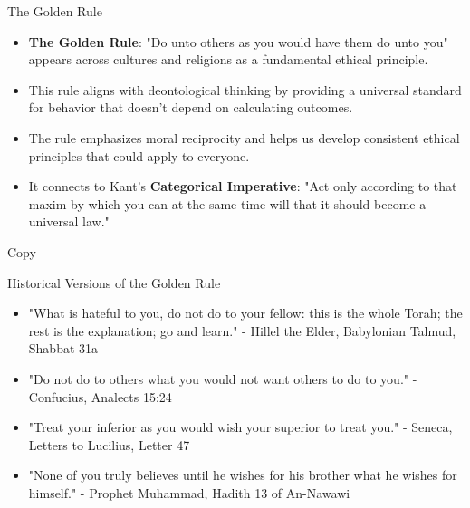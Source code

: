 \documentclass{beamer}
\begin{document}
\begin{frame}{The Golden Rule}
\begin{itemize}
    \item \textbf{The Golden Rule}: "Do unto others as you would have them do unto you" appears across cultures and religions as a fundamental ethical principle.
    
    \item This rule aligns with deontological thinking by providing a universal standard for behavior that doesn't depend on calculating outcomes.
    
    \item The rule emphasizes moral reciprocity and helps us develop consistent ethical principles that could apply to everyone.
    
    \item It connects to Kant's \textbf{Categorical Imperative}: "Act only according to that maxim by which you can at the same time will that it should become a universal law."
\end{itemize}
\end{frame}

Copy\begin{frame}{Historical Versions of the Golden Rule}
\begin{itemize}
   \item "What is hateful to you, do not do to your fellow: this is the whole Torah; the rest is the explanation; go and learn." 
   - Hillel the Elder, Babylonian Talmud, Shabbat 31a
   
   \item "Do not do to others what you would not want others to do to you."
   - Confucius, Analects 15:24
   
   \item "Treat your inferior as you would wish your superior to treat you."
   - Seneca, Letters to Lucilius, Letter 47
   
   \item "None of you truly believes until he wishes for his brother what he wishes for himself."
   - Prophet Muhammad, Hadith 13 of An-Nawawi
\end{itemize}
\end{frame}
\end{document}
